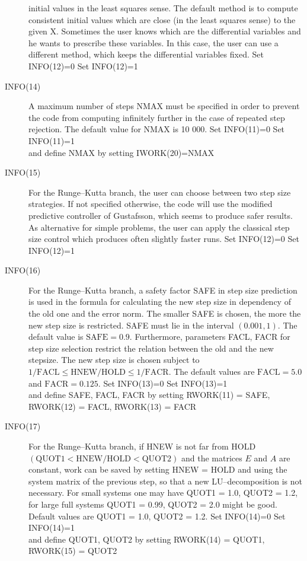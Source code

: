 \begin{description}
  initial values in the least squares sense. The default method is to
  compute consistent initial values which are close (in the least
  squares sense) to the given X. Sometimes the user knows which are the
  differential variables and he wants to prescribe these variables.
  In this case, the user can use a different method, which keeps the
  differential variables fixed.
   {Set INFO(12)=0}
   {Set INFO(12)=1}
\item[INFO(14)] A maximum number of steps NMAX must be specified in order to
  prevent the code from computing infinitely further in the case of repeated
  step rejection. The default value for NMAX is 10 000.
  {Set INFO(11)=0}
  {Set INFO(11)=1\\
    and define NMAX by setting IWORK(20)=NMAX}
\item[INFO(15)] For the Runge--Kutta branch, the user can choose between two
  step size strategies. If not specified otherwise, the code will use
  the modified predictive controller of Gustafsson, which seems to produce
  safer results. As alternative for simple problems, the user can apply the
  classical step size control which produces often slightly faster runs.
  {Set INFO(12)=0}
  {Set INFO(12)=1}
\item[INFO(16)] For the Runge--Kutta branch, a safety factor SAFE in
  step size prediction is used in the formula for calculating the new
  step size in dependency of the old one and the error norm. The
  smaller SAFE is chosen, the more the new step size is
  restricted. SAFE must lie in the interval $(0.001,1)$. The default 
  value is $\mbox{SAFE}=0.9$. Furthermore, parameters FACL, FACR for
  step size selection restrict the relation between the old and the
  new stepsize. The new step size is chosen subject to $\mbox{1/FACL}
  \le \mbox{HNEW/HOLD} \le \mbox{1/FACR}.$ The default values are
  $\mbox{FACL}=5.0$ and $\mbox{FACR}=0.125$.
  {Set INFO(13)=0}
  {Set INFO(13)=1\\
    and define SAFE, FACL, FACR by setting RWORK(11) = SAFE,
    RWORK(12) = FACL, RWORK(13) = FACR}
\item[INFO(17)] For the Runge--Kutta branch, if HNEW is not far from HOLD
  $(\mbox{QUOT1} < \mbox{HNEW/HOLD} < \mbox{QUOT2})$
  and the matrices $E$ and $A$ are constant, work can be saved by setting
  HNEW = HOLD and using the system matrix of the previous step, so that a
  new LU--decomposition is not necessary. For small systems one may have
  QUOT1 = 1.0, QUOT2 = 1.2, for large full systems QUOT1 = 0.99, QUOT2 = 2.0
  might be good. Default values are QUOT1 = 1.0, QUOT2 = 1.2.
  {Set INFO(14)=0}
  {Set INFO(14)=1\\
    and define QUOT1, QUOT2 by setting RWORK(14) = QUOT1, RWORK(15) = QUOT2}
\end{description}

